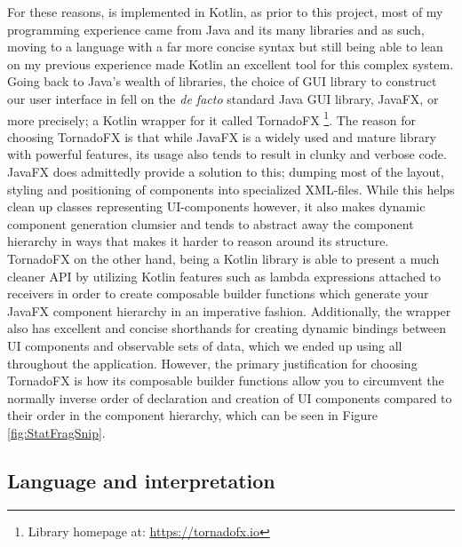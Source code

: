 For these reasons, \cname{} is implemented in Kotlin, as prior to this project, most of my programming experience came from Java and its many libraries and as such, moving to a language with a far more concise syntax but still being able to lean on my previous experience made Kotlin an excellent tool for this complex system. Going back to Java's wealth of libraries, the choice of GUI library to construct our user interface in fell on the \textit{de facto} standard Java GUI library, JavaFX, or more precisely; a Kotlin wrapper for it called TornadoFX \footnote{Library homepage at: \url{https://tornadofx.io}}. The reason for choosing TornadoFX is that while JavaFX is a widely used and mature library with powerful features, its usage also tends to result in clunky and verbose code. JavaFX does admittedly provide a solution to this; dumping most of the layout, styling and positioning of components into specialized XML-files. While this helps clean up classes representing UI-components however, it also makes dynamic component generation clumsier and tends to abstract away the component hierarchy in ways that makes it harder to reason around its structure. TornadoFX on the other hand, being a Kotlin library is able to present a much cleaner API by utilizing Kotlin features such as lambda expressions attached to receivers in order to create composable builder functions which generate your JavaFX component hierarchy in an imperative fashion. Additionally, the wrapper also has excellent and concise shorthands for creating dynamic bindings between UI components and observable sets of data, which we ended up using all throughout the application. However, the primary justification for choosing TornadoFX is how its composable builder functions allow you to circumvent the normally inverse order of declaration and creation of UI components compared to their order in the component hierarchy, which can be seen in Figure \ref{fig:StatFragSnip}.


\subsection{Language and interpretation}

